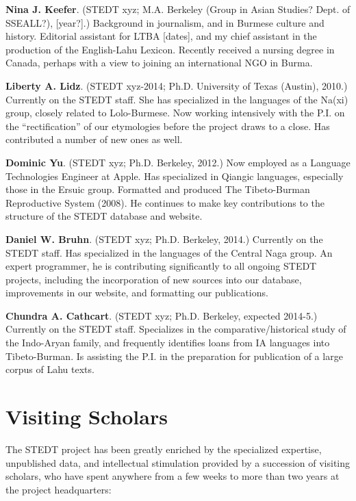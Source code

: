 \textbf{Nina J. Keefer}. (STEDT xyz; M.A. Berkeley (Group in Asian Studies? Dept. of SSEALL?), [year?].) Background in journalism, and in Burmese culture and history. Editorial assistant for LTBA [dates], and my chief assistant in the production of the English-Lahu Lexicon. Recently received a nursing degree in Canada, perhaps with a view to joining an international NGO in Burma.

\textbf{Liberty A. Lidz}. (STEDT xyz-2014; Ph.D. University of Texas (Austin), 2010.) Currently on the STEDT staff. She has specialized in the languages of the Na(xi) group, closely related to Lolo-Burmese. Now working intensively with the P.I. on the “rectification” of our etymologies before the project draws to a close. Has contributed a number of new ones as well.

\textbf{Dominic Yu}. (STEDT xyz; Ph.D. Berkeley, 2012.) Now employed as a Language Technologies Engineer at Apple. Has specialized in Qiangic languages, especially those in the Ersuic group. Formatted and produced The Tibeto-Burman Reproductive System (2008). He continues to make key contributions to the structure of the STEDT database and website.

\textbf{Daniel W. Bruhn}. (STEDT xyz; Ph.D. Berkeley, 2014.) Currently on the STEDT staff. Has specialized in the languages of the Central Naga group. An expert programmer, he is contributing significantly to all ongoing STEDT projects, including the incorporation of new sources into our database, improvements in our website, and formatting our publications.

\textbf{Chundra A. Cathcart}. (STEDT xyz; Ph.D. Berkeley, expected 2014-5.) Currently on the STEDT staff. Specializes in the comparative/historical study of the Indo-Aryan family, and frequently identifies loans from IA languages into Tibeto-Burman. Is assisting the P.I. in the preparation for publication of a large corpus of Lahu texts.

\section{Visiting Scholars}

The STEDT project has been greatly enriched by the specialized expertise, unpublished data, and intellectual stimulation provided by a succession of visiting scholars, who have spent anywhere from a few weeks to more than two years at the project headquarters: 

